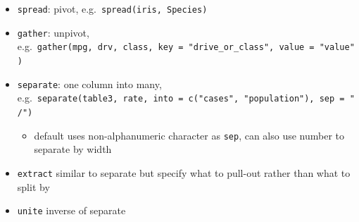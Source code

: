 \documentclass[]{book}
\newenvironment{Shaded}{\begin{snugshade}}{\end{snugshade}}
\newcommand{\CommentTok}[1]{\textcolor[rgb]{0.56,0.35,0.01}{\textit{#1}}}
\newcommand{\DataTypeTok}[1]{\textcolor[rgb]{0.13,0.29,0.53}{#1}}
\newcommand{\KeywordTok}[1]{\textcolor[rgb]{0.13,0.29,0.53}{\textbf{#1}}}
\newcommand{\NormalTok}[1]{#1}
\newcommand{\OperatorTok}[1]{\textcolor[rgb]{0.81,0.36,0.00}{\textbf{#1}}}
\newcommand{\OtherTok}[1]{\textcolor[rgb]{0.56,0.35,0.01}{#1}}
\newcommand{\StringTok}[1]{\textcolor[rgb]{0.31,0.60,0.02}{#1}}
\providecommand{\tightlist}{%
  \setlength{\itemsep}{0pt}\setlength{\parskip}{0pt}}
\theoremstyle{definition}
\theoremstyle{definition}
\theoremstyle{definition}
\theoremstyle{remark}
\begin{document}
\begin{itemize}
\tightlist
\item
  \texttt{spread}: pivot, e.g.~\texttt{spread(iris,\ Species)}
\item
  \texttt{gather}: unpivot,
  e.g.~\texttt{gather(mpg,\ drv,\ class,\ key\ =\ "drive\_or\_class",\ value\ =\ "value")}
\item
  \texttt{separate}: one column into many,
  e.g.~\texttt{separate(table3,\ rate,\ into\ =\ c("cases",\ "population"),\ sep\ =\ "/")}

  \begin{itemize}
  \tightlist
  \item
    default uses non-alphanumeric character as \texttt{sep}, can also
    use number to separate by width
  \end{itemize}
\item
  \texttt{extract} similar to separate but specify what to pull-out
  rather than what to split by
\item
  \texttt{unite} inverse of separate
\end{itemize}

\begin{Shaded}
\end{Shaded}
\end{document}
